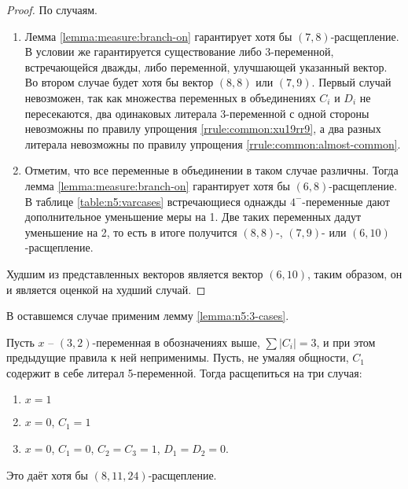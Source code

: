 \begin{proof}
 По случаям.
 \begin{enumerate}
  \item Лемма \ref{lemma:measure:branch-on} гарантирует хотя бы $(7,8)$-расщепление. В условии же гарантируется существование либо 3-переменной, встречающейся дважды, либо переменной, улучшающей указанный вектор. Во втором случае будет хотя бы вектор $(8,8)$ или $(7,9)$. Первый случай невозможен, так как множества переменных в объединениях $C_i$ и $D_i$ не пересекаются, два одинаковых литерала 3-переменной с одной стороны невозможны по правилу упрощения \ref{rrule:common:xu19rr9}, а два разных литерала невозможны по правилу упрощения \ref{rrule:common:almost-common}.

  \item Отметим, что все переменные в объединении в таком случае различны. Тогда лемма \ref{lemma:measure:branch-on} гарантирует хотя бы $(6,8)$-расщепление. В таблице \ref{table:n5:varcases} встречающиеся однажды $4^-$-переменные дают дополнительное уменьшение меры на 1. Две таких переменных дадут уменьшение на 2, то есть в итоге получится $(8,8)$-, $(7,9)$- или $(6,10)$-расщепление.
 \end{enumerate}

 Худшим из представленных векторов является вектор $(6,10)$, таким образом, он и является оценкой на худший случай.
\end{proof}

В оставшемся случае применим лемму \ref{lemma:n5:3-cases}.

\begin{brule}
 Пусть $x$ -- $(3,2)$-переменная в обозначениях выше, $\sum |C_i| = 3$, и при этом предыдущие правила к ней неприменимы. Пусть, не умаляя общности, $C_1$ содержит в себе литерал 5-переменной. Тогда расщепиться на три случая:

 \begin{enumerate}
  \item $x = 1$
  \item $x = 0$, $C_1 = 1$
  \item $x = 0$, $C_1 = 0$, $C_2 = C_3 = 1$, $D_1 = D_2 = 0$.
 \end{enumerate}

 Это даёт хотя бы $(8,11,24)$-расщепление.
 \label{brule:n5:32-rest:c4:3-cases}
\end{brule}

